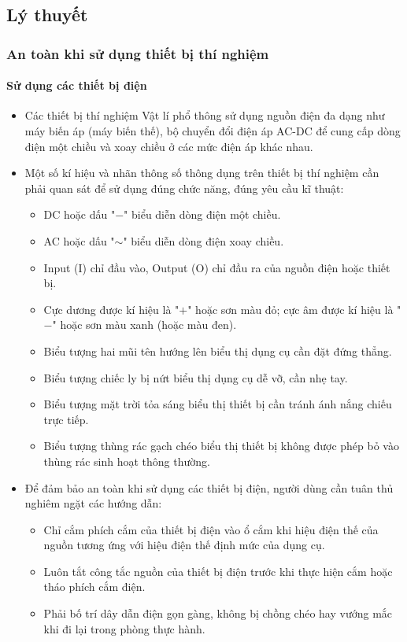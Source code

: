 

\subsection{Lý thuyết}

\subsubsection{An toàn khi sử dụng thiết bị thí nghiệm}
\paragraph{Sử dụng các thiết bị điện}
\begin{itemize}
	\item Các thiết bị thí nghiệm Vật lí phổ thông sử dụng nguồn điện đa dạng như máy biến áp (máy biến thế), bộ chuyển đổi điện áp AC-DC để cung cấp dòng điện một chiều và xoay chiều ở các mức điện áp khác nhau.
	\item Một số kí hiệu và nhãn thông số thông dụng trên thiết bị thí nghiệm cần phải quan sát để sử dụng đúng chức năng, đúng yêu cầu kĩ thuật:
	\begin{itemize}
		\item DC hoặc dấu "$-$" biểu diễn dòng điện một chiều.
		\item AC hoặc dấu "$\sim$" biểu diễn dòng điện xoay chiều.
		\item Input (I) chỉ đầu vào, Output (O) chỉ đầu ra của nguồn điện hoặc thiết bị.
		\item Cực dương được kí hiệu là "$+$" hoặc sơn màu đỏ; cực âm được kí hiệu là "$-$" hoặc sơn màu xanh (hoặc màu đen).
		\item Biểu tượng hai mũi tên hướng lên biểu thị dụng cụ cần đặt đứng thẳng.
		\item Biểu tượng chiếc ly bị nứt biểu thị dụng cụ dễ vỡ, cần nhẹ tay.
		\item Biểu tượng mặt trời tỏa sáng biểu thị thiết bị cần tránh ánh nắng chiếu trực tiếp.
		\item Biểu tượng thùng rác gạch chéo biểu thị thiết bị không được phép bỏ vào thùng rác sinh hoạt thông thường.
	\end{itemize}
	\item Để đảm bảo an toàn khi sử dụng các thiết bị điện, người dùng cần tuân thủ nghiêm ngặt các hướng dẫn:
	\begin{itemize}
		\item Chỉ cắm phích cắm của thiết bị điện vào ổ cắm khi hiệu điện thế của nguồn tương ứng với hiệu điện thế định mức của dụng cụ.
		\item Luôn tắt công tắc nguồn của thiết bị điện trước khi thực hiện cắm hoặc tháo phích cắm điện.
		\item Phải bố trí dây dẫn điện gọn gàng, không bị chồng chéo hay vướng mắc khi đi lại trong phòng thực hành.
	\end{itemize}
\end{itemize}

